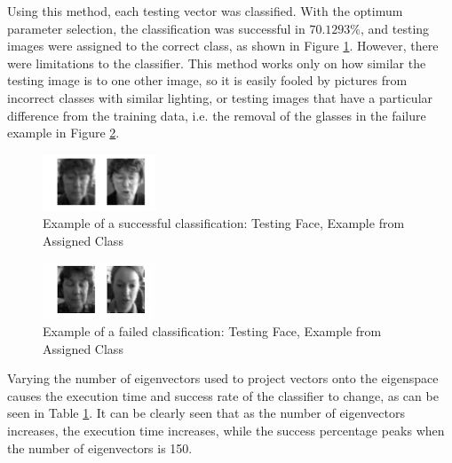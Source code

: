 \documentclass[10pt,twocolumn,letterpaper]{article}
\begin{document}
Using this method, each testing vector was classified. With the optimum parameter selection, the classification was successful in $70.1293\%$, and testing images were assigned to the correct class, as shown in Figure \ref{fig:Q2B_NN_success}. However, there were limitations to the classifier. This method works only on how similar the testing image is to one other image, so it is easily fooled by pictures from incorrect classes with similar lighting, or testing images that have a particular difference from the training data, i.e. the removal of the glasses in the failure example in Figure \ref{fig:Q2B_NN_failure}.

\begin{figure}[H]
\begin{center}
  
    \includegraphics[width=0.3\textwidth]{../results/Q2B_NN_success}

  \caption{Example of a successful classification: Testing Face, Example from Assigned Class \label{fig:Q2B_NN_success}}

\end{center}
\end{figure}

\begin{figure}[H]
\begin{center}
  
    \includegraphics[width=0.3\textwidth]{../results/Q2B_NN_failure}

  \caption{Example of a failed classification: Testing Face, Example from Assigned Class \label{fig:Q2B_NN_failure}}

\end{center}
\end{figure}

Varying the number of eigenvectors used to project vectors onto the eigenspace causes the execution time and success rate of the classifier to change, as can be seen in Table  \ref{fig:Q2B_NN_success}. It can be clearly seen that as the number of eigenvectors increases, the execution time increases, while the success percentage peaks when the number of eigenvectors is 150.
\end{document}
